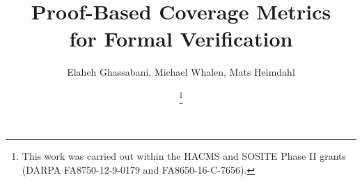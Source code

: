 \documentclass[conference]{IEEEtran}
\begin{document}
\newcommand{\mike}[1]{\textcolor{red}{#1}}
\newcommand{\fixed}[1]{\textcolor{purple}{#1}}
\newcommand{\andrew}[1]{\textcolor{green}{#1}}
\newcommand{\ela}[1]{\textcolor{blue}{#1}}
\newcommand{\stateequiv}{\equiv_{s}}
\newcommand{\traceequiv}{\equiv_{\sigma}}
\newcommand{\ta}{\text{TA}}
\newcommand{\cta}{\text{TA$_{C}$}}
\newcommand{\tta}{\text{TA$_{T}$}}

\newcommand{\bfalg}{{\small {IVC\_BF}}\xspace}
\newcommand{\ucalg}{{\small {IVC\_UC}}\xspace}
\newcommand{\ucbfalg}{{\small {IVC\_UCBF}}\xspace}
\newcommand{\mustalg}{{\small {IVC\_MUST}}\xspace}

\newtheorem{definition}{Definition}
\newtheorem{lemma}{Lemma}
\newtheorem{theorem}{Theorem}
\newtheorem{coroll}{Corollary}
\newtheorem{note}{Note}
%
\title{Proof-Based Coverage Metrics\\for Formal Verification}


\author{\IEEEauthorblockN
{
Elaheh Ghassabani, Michael Whalen, Mats Heimdahl
}
\and
{}
\thanks{This work was carried out within the HACMS and SOSITE Phase II grants (DARPA FA8750-12-9-0179 and FA8650-16-C-7656).}
}

\end{document}
